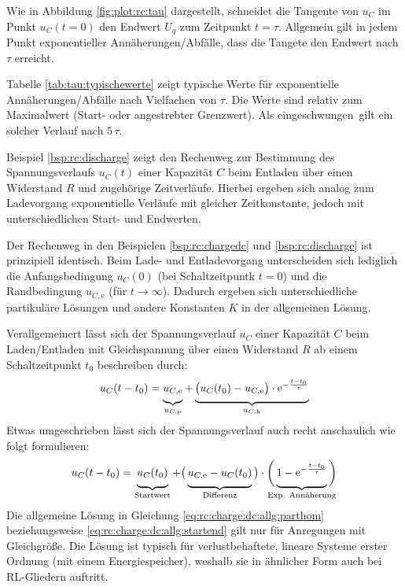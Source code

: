 \begin{frame}[t]
{    Wie in Abbildung \ref{fig:plot:rc:tau} dargestellt, schneidet die Tangente von $u_C$ im Punkt $u_C(t=0)$
    den Endwert $U_q$ zum Zeitpunkt $t=\tau$. Allgemein gilt in jedem Punkt exponentieller Annäherungen/Abfälle, dass die Tangete den Endwert nach $\tau$ erreicht.

    Tabelle \ref{tab:tau:typischewerte} zeigt typische Werte für exponentielle Annäherungen/Abfälle nach Vielfachen von $\tau$.
    Die Werte sind relativ zum Maximalwert (Start- oder angestrebter Grenzwert).
    Als \glqq eingeschwungen\grqq\ gilt ein solcher Verlauf nach $5\,\tau$.

    Beispiel \ref{bsp:rc:discharge} zeigt den Rechenweg zur Bestimmung des Spannungsverlaufs $u_C(t)$
    einer Kapazität $C$ beim Entladen über einen Widerstand $R$ und zugehörige Zeitverläufe.
    Hierbei ergeben sich analog zum Ladevorgang exponentielle Verläufe mit gleicher Zeitkonstante, jedoch mit unterschiedlichen Start- und Endwerten.

    Der Rechenweg in den Beispielen \ref{bsp:rc:chargedc} und \ref{bsp:rc:discharge} ist prinzipiell identisch.
    Beim Lade- und Entladevorgang unterscheiden sich lediglich die Anfangsbedingung $u_C(0)$ (bei Schaltzeitpuntk $t=0$) und die Randbedingung $u_{C,\mathrm{e}}$ (für $t \to \infty$).
    Dadurch ergeben sich unterschiedliche partikuläre Lösungen und andere Konstanten $K$ in der allgemeinen Lösung.

    Verallgemeinert lässt sich der Spannungsverlauf $u_C$ einer Kapazität $C$ beim Laden/Entladen mit Gleichspannung über einen Widerstand $R$
    ab einem Schaltzeitpunkt $t_0$ beschreiben durch:
    \begin{equation}\label{eq:rc:charge:dc:allg:parthom}
        u_C(t-t_0) = \underbrace{ u_{C,\mathrm{e}} \vphantom{\Big|}}_{u_{C,\mathrm{p}}} + \underbrace{ \big(u_C(t_0)-u_{C,\mathrm e}\big) \cdot  \mathrm{e}^{-\frac{t-t_0}{\tau}} \vphantom{\Big|}}_{u_{C,\mathrm{h}}}
    \end{equation}
    Etwas umgeschrieben lässt sich der Spannungsverlauf auch recht anschaulich wie folgt formulieren:
    \begin{equation}\label{eq:rc:charge:dc:allg:startend}
        u_C(t-t_0) = \underbrace{u_C(t_0) \vphantom{\Big|}}_{\text{Startwert}} + \big(\underbrace{u_{C,\mathrm e} - u_C(t_0) \vphantom{\Big|}}_{\text{Differenz}}\big) \cdot \bigg( \underbrace{ 1- \mathrm{e}^{-\frac{t-t_0}{\tau}} \vphantom{\Big|}}_{\text{\clap{Exp. Annäherung}}} \bigg)
    \end{equation}
    Die allgemeine Lösung in Gleichung \ref{eq:rc:charge:dc:allg:parthom} beziehungsweise \ref{eq:rc:charge:dc:allg:startend} gilt nur für Anregungen mit Gleichgröße.
    Die Lösung ist typisch für verlustbehaftete, lineare Systeme erster Ordnung (mit einem Energiespeicher), weshalb sie in ähnlicher Form auch bei RL-Gliedern auftritt.

}
\end{frame}

